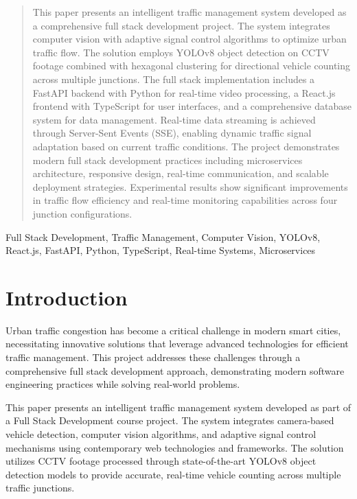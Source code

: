 \documentclass[conference]{IEEEtran}
\begin{document}
\begin{abstract}
This paper presents an intelligent traffic management system developed as a comprehensive full stack development project. The system integrates computer vision with adaptive signal control algorithms to optimize urban traffic flow. The solution employs YOLOv8 object detection on CCTV footage combined with hexagonal clustering for directional vehicle counting across multiple junctions. The full stack implementation includes a FastAPI backend with Python for real-time video processing, a React.js frontend with TypeScript for user interfaces, and a comprehensive database system for data management. Real-time data streaming is achieved through Server-Sent Events (SSE), enabling dynamic traffic signal adaptation based on current traffic conditions. The project demonstrates modern full stack development practices including microservices architecture, responsive design, real-time communication, and scalable deployment strategies. Experimental results show significant improvements in traffic flow efficiency and real-time monitoring capabilities across four junction configurations.
\end{abstract}

\begin{IEEEkeywords}
Full Stack Development, Traffic Management, Computer Vision, YOLOv8, React.js, FastAPI, Python, TypeScript, Real-time Systems, Microservices
\end{IEEEkeywords}

\section{Introduction}

Urban traffic congestion has become a critical challenge in modern smart cities, necessitating innovative solutions that leverage advanced technologies for efficient traffic management. This project addresses these challenges through a comprehensive full stack development approach, demonstrating modern software engineering practices while solving real-world problems.

This paper presents an intelligent traffic management system developed as part of a Full Stack Development course project. The system integrates camera-based vehicle detection, computer vision algorithms, and adaptive signal control mechanisms using contemporary web technologies and frameworks. The solution utilizes CCTV footage processed through state-of-the-art YOLOv8 object detection models to provide accurate, real-time vehicle counting across multiple traffic junctions.
\end{document}
